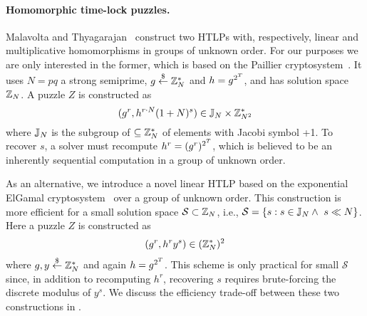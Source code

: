 
% 


\paragraph{Homomorphic time-lock puzzles.} Malavolta and Thyagarajan~\cite{C:MalThy19} construct two HTLPs with, respectively, linear and multiplicative homomorphisms in groups of unknown order. For our purposes we are only interested in the former, which is based on the Paillier cryptosystem~\cite{EC:Paillier99}. It uses $N=pq$ a strong semiprime, $g \stackrel{\$}{\gets} \mathbb{Z}_N^*$ and $h = g^{2^{T}}$, and has solution space $\mathbb{Z}_N$. A puzzle $Z$ is constructed as
\begin{equation}\label{eq:paillierHTLP}
(g^r, h^{r \cdot N} (1+N)^s) \in \mathbb{J}_N \times \mathbb{Z}_{N^2}^*
\end{equation}
where $\mathbb{J}_N$ is the subgroup of $\subseteq \mathbb{Z}_N^*$ of elements with Jacobi symbol +1.
To recover $s$, a solver must recompute $h^r = (g^r)^{2^{T}}$, which is believed to be an inherently sequential computation in a group of unknown order.

As an alternative, we introduce a novel linear HTLP based on the exponential ElGamal cryptosystem~\cite{EC:CraGenSch97} over a group of unknown order. This construction is more efficient for a small solution space $\mathcal{S} \subset \mathbb{Z}_N$, i.e., $\mathcal{S} = \{ s : s \in \mathbb{J}_N \land\ s \ll N \}$. Here a puzzle $Z$ is constructed as
\begin{equation}\label{eq:exp_elgamalHTLP}
(g^r, h^r y^s) \in (\mathbb{Z}_N^*)^2
\end{equation}
where $g,y \stackrel{\$}{\gets} \mathbb{Z}_N^*$ and again $h = g^{2^{T}}$. This scheme is only practical for small $\mathcal{S}$ since, in addition to recomputing $h^r$, recovering $s$ requires brute-forcing the discrete modulus of $y^s$. We discuss the efficiency trade-off between these two constructions in \cite{EPRINT:GSZB23}.

